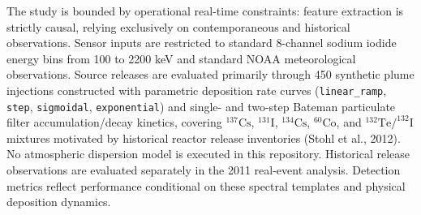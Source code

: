 \documentclass[11pt,a4paper]{article}
\begin{document}
\begin{framed}
The study is bounded by operational real-time constraints: feature extraction is strictly causal, relying exclusively on contemporaneous and historical observations. Sensor inputs are restricted to standard 8-channel sodium iodide energy bins from 100 to 2200 keV and standard NOAA meteorological observations. Source releases are evaluated primarily through 450 synthetic plume injections constructed with parametric deposition rate curves (\texttt{linear\_ramp}, \texttt{step}, \texttt{sigmoidal}, \texttt{exponential}) and single- and two-step Bateman particulate filter accumulation/decay kinetics, covering $^{137}\text{Cs}$, $^{131}\text{I}$, $^{134}\text{Cs}$, $^{60}\text{Co}$, and $^{132}\text{Te}/^{132}\text{I}$ mixtures motivated by historical reactor release inventories (Stohl et al., 2012). No atmospheric dispersion model is executed in this repository. Historical release observations are evaluated separately in the 2011 real-event analysis. Detection metrics reflect performance conditional on these spectral templates and physical deposition dynamics.
\end{framed}

\newpage
\end{document}
